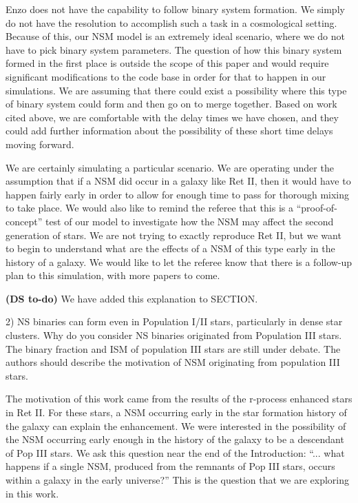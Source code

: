 \documentclass[11pt]{article}
\begin{document}
Enzo does not have the capability to follow binary system formation. We simply do not have the resolution to accomplish such a task in a cosmological setting. Because of this, our NSM model is an extremely ideal scenario, where we do not have to pick binary system parameters. The question of how this binary system formed in the first place is outside the scope of this paper and would require significant modifications to the code base in order for that to happen in our simulations. We are assuming that there could exist a possibility where this type of binary system could form and then go on to merge together. Based on work cited above, we are comfortable with the delay times we have chosen, and they could add further information about the possibility of these short time delays moving forward.

We are certainly simulating a particular scenario. We are operating under the assumption that if a NSM did occur in a galaxy like Ret II, then it would have to happen fairly early in order to allow for enough time to pass for thorough mixing to take place. We would also like to remind the referee that this is a ``proof-of-concept'' test of our model to investigate how the NSM may affect the second generation of stars. We are not trying to exactly reproduce Ret II, but we want to begin to understand what are the effects of a NSM of this type early in the history of a galaxy. We would like to let the referee know that there is a follow-up plan to this simulation, with more papers to come.

\textbf{(DS to-do)} We have added this explanation to SECTION.

\begin{tcolorbox}[colback={lightgray}]
    2)      NS binaries can form even in Population I/II stars, particularly in dense star clusters. Why do you consider NS binaries originated from Population III stars. The binary fraction and ISM of population III stars are still under debate. The authors should describe the motivation of NSM originating from population III stars.
\end{tcolorbox}

The motivation of this work came from the results of the r-process enhanced stars in Ret II. For these stars, a NSM occurring early in the star formation history of the galaxy can explain the enhancement. We were interested in the possibility of the NSM occurring early enough in the history of the galaxy to be a descendant of Pop III stars. We ask this question near the end of the Introduction: ``... what happens if a single NSM, produced from the remnants of Pop III stars, occurs within a galaxy in the early universe?'' This is the question that we are exploring in this work.
\end{document}
